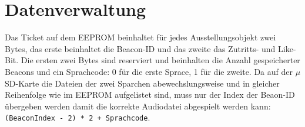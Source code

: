  \section{Datenverwaltung}
Das Ticket auf dem EEPROM beinhaltet für jedes Ausstellungsobjekt zwei Bytes, das erste beinhaltet die Beacon-ID und das zweite das Zutritts- und Like-Bit.
Die ersten zwei Bytes sind reserviert und beinhalten die Anzahl gespeicherter Beacons und ein Sprachcode: 0 für die erste Sprace, 1 für die zweite.
Da auf der $\mu$SD-Karte die Dateien der zwei Sparchen abewechslungsweise und in gleicher Reihenfolge wie im EEPROM aufgelistet sind, muss nur der Index der Beaon-ID übergeben werden damit die korrekte Audiodatei abgespielt werden kann: \\
\texttt{(BeaconIndex - 2) * 2 + Sprachcode}.
